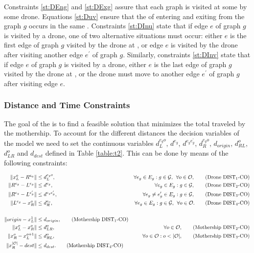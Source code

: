 \noindent 
{}  Constraints \eqref{st:DEng} and \eqref{st:DExg} assure that each graph is visited at some  by some drone. Equations \eqref{st:Duv} ensure that the  of entering and exiting from the graph $g$ occurs in the same . Constraints \eqref{st:DInu} state that if  edge $e$ of graph $g$ is visited by a drone, one of two alternative situations must occur: either $e$ is the first edge of graph $g$ visited by the drone at , or edge $e$ is visited by the drone after visiting another edge $e^\prime$ of graph $g$. Similarly, constraints \eqref{st:DInv} state that if  edge $e$ of graph $g$ is visited by a drone, either $e$ is the last edge of graph $g$ visited by the drone at , or the drone must move to another edge $e^\prime$ of graph $g$ after visiting edge $e$.

\subsubsection*{Distance and Time Constraints}
\noindent
The goal of the \AMDCO\xspace is to find a feasible solution that minimizes the total  traveled by the mothership. To account for the different distances  the decision variables of the model we need to set the continuous variables $d_L^{e_go}$, $d^{e_g}$, $d^{e_ge^\prime_g}$, $d_R^{e_go}$, $d_{origin}$, $d_{RL}^o$, $d_{LR}^o$ and $d_{dest}$ defined in Table \ref{table:t2}. This can be done by means of the following constraints:

\begin{align*}
\|x_L^o- R^{e_g}\| & \leq  d_L^{e_go},  &\forall e_g\in E_g:g\in \mathcal{G}, \:\:\forall o\in \mathcal O, \tag{Drone DIST$_{1}$-CO} \label{eq:drone-d1-async-CO}\\
\|R^{e_g}- L^{e_g}\| & \leq  d^{e_g},  &\forall e_g\in E_g:g\in \mathcal{G}, \tag{Drone DIST$_{2}$-CO} \label{eq:drone-d2-async-CO}\\
\|R^{e_g}- L^{e'_g}\| & \leq  d^{e_ge'_g}, &\forall e_g\neq e_g'\in E_g:g\in \mathcal{G}, \tag{Drone DIST$_{3}$-CO} \label{eq:drone-d3-async-CO}\\
\|L^{e_g}- x_R^o\| & \leq  d_R^{e_o}, &\forall e_g\in E_g:g\in \mathcal{G},\:\:\forall o\in \mathcal O. \tag{Drone DIST$_{4}$-CO} \label{eq:drone-d4-async-CO}\\\\
\|origin - x_L^1\| & \leq d_{origin}, \tag{Mothership DIST$_1$-CO}\label{eq:mothership-d1-async-CO}\\
\|x_L^o - x_R^{o}\| & \leq d_{LR}^{o}, &\forall o\in\mathcal O, \tag{Mothership DIST$_{2}$-CO}\label{eq:mothership-d3-async-CO}\\
\|x_R^o - x_L^{o+1}\| & \leq d_{RL}^{o}, &\forall o\in\mathcal O:o<|\mathcal O|, \tag{Mothership DIST$_{3}$-CO}\label{eq:mothership-d4-async-CO}\\
\|x_R^{|\mathcal O|} - dest\| & \leq d_{dest}. \tag{Mothership DIST$_4$-CO}\label{eq:mothership-d6-async-CO}
\end{align*}

